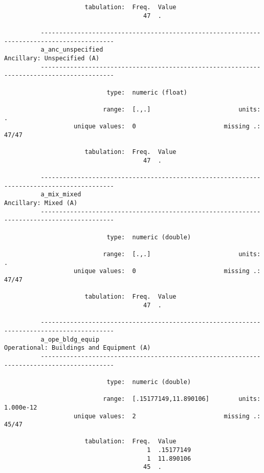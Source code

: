 \documentclass{article}
\begin{document}
\begin{verbatim}
                      tabulation:  Freq.  Value
                                      47  .
          
          ------------------------------------------------------------------------------------------
          a_anc_unspecified                                               Ancillary: Unspecified (A)
          ------------------------------------------------------------------------------------------
          
                            type:  numeric (float)
          
                           range:  [.,.]                        units:  .
                   unique values:  0                        missing .:  47/47
          
                      tabulation:  Freq.  Value
                                      47  .
          
          ------------------------------------------------------------------------------------------
          a_mix_mixed                                                           Ancillary: Mixed (A)
          ------------------------------------------------------------------------------------------
          
                            type:  numeric (double)
          
                           range:  [.,.]                        units:  .
                   unique values:  0                        missing .:  47/47
          
                      tabulation:  Freq.  Value
                                      47  .
          
          ------------------------------------------------------------------------------------------
          a_ope_bldg_equip                                  Operational: Buildings and Equipment (A)
          ------------------------------------------------------------------------------------------
          
                            type:  numeric (double)
          
                           range:  [.15177149,11.890106]        units:  1.000e-12
                   unique values:  2                        missing .:  45/47
          
                      tabulation:  Freq.  Value
                                       1  .15177149
                                       1  11.890106
                                      45  .
          

\end{verbatim}
\end{document}
